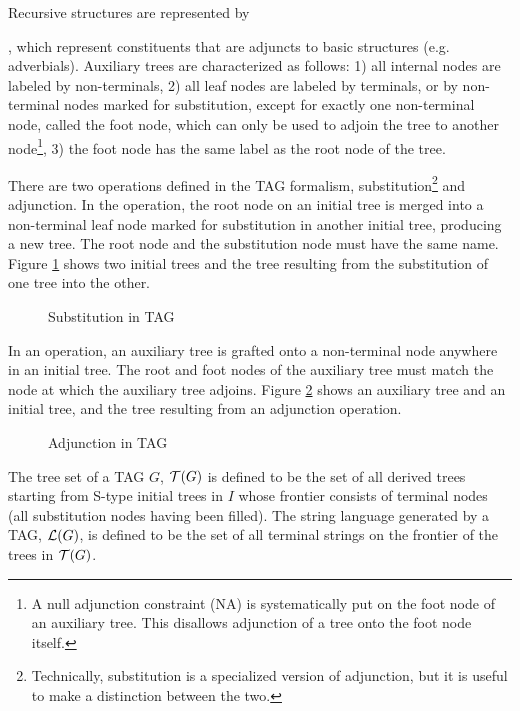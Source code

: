 Recursive structures are represented by {, which
represent constituents that are adjuncts to basic structures (e.g. adverbials).
Auxiliary trees are characterized as follows: 1) all internal nodes are labeled
by non-terminals, 2) all leaf nodes are labeled by terminals, or by
non-terminal nodes marked for substitution, except for exactly one non-terminal
node, called the foot node, which can only be used to adjoin the tree to
another node\footnote{A null adjunction constraint (NA) is systematically put
on the foot node of an auxiliary tree. This disallows adjunction of a tree onto
the foot node itself.}, 3) the foot node has the same label as the root node of
the tree.

There are two operations defined in the TAG formalism,
substitution\footnote{Technically, substitution is a specialized version of
adjunction, but it is useful to make a distinction between the two.} and
adjunction.  In the  operation, the root node on an
initial tree is merged into a non-terminal leaf node marked for substitution in
another initial tree, producing a new tree.  The root node and the substitution
node must have the same name.  Figure \ref{proto-subst} shows two initial trees
and the tree resulting from the substitution of one tree into the other.

\begin{figure}[htb]
\centering
{}
\caption{Substitution in TAG}
\label{proto-subst}
\end{figure}

In an  operation, an auxiliary tree is grafted onto a
non-terminal node anywhere in an initial tree.  The root and foot nodes of the
auxiliary tree must match the node at which the auxiliary tree adjoins.  Figure
\ref{proto-adjunction} shows an auxiliary tree and an initial tree, and the
tree resulting from an adjunction operation.

\begin{figure}[htb]
\centering
{}
\caption{Adjunction in TAG}
\label{proto-adjunction}
\end{figure}

The tree set of a TAG $G$, ${\cal T}(G)$ is defined to be the set
of all derived trees starting from S-type initial trees in $I$ whose frontier
consists of terminal nodes (all substitution nodes having been filled). The
string language generated by a TAG, ${\cal L}(G)$, is defined to be the
set of all terminal strings on the frontier of the trees in ${\cal T}(G)$.

}
